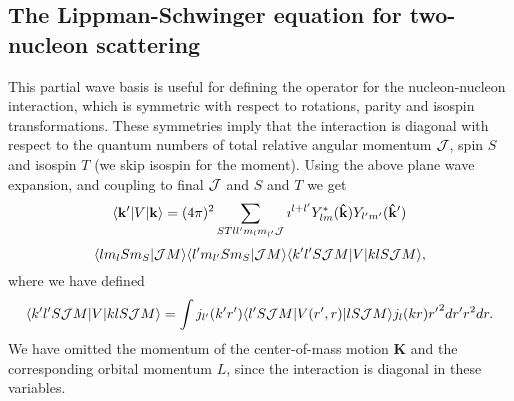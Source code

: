 \documentclass[%
twoside,                 %
final,                   %
10pt]{article}
\begin{document}
\subsection{The Lippman-Schwinger equation for two-nucleon scattering}
\begin{block}{}
This partial wave basis is useful for defining the operator for
the nucleon-nucleon interaction, which
is symmetric with respect to rotations, parity and
isospin transformations. These symmetries imply that the interaction is
diagonal with respect to the quantum numbers of total relative angular
momentum ${\cal J}$, spin $S$ and isospin $T$ (we skip isospin for the moment). Using the above plane wave expansion,
and coupling to final ${\cal J}$ and $S$ and $T$ we get
\[
 \langle\mathbf{k'}\vert V \vert\mathbf{k}\rangle= (4\pi)^2 \sum_{STll'm_lm_{l'}{\cal J}}\imath^{l+l'} Y_{lm}^{*}(\mathbf{\hat{k}}) Y_{l'm'}(\mathbf{\hat{k}'})
\]
\[
\langle lm_lSm_S|{\cal J}M\rangle \langle l'm_{l'}Sm_S|{\cal J}M\rangle\langle k'l'S{\cal J}M\vert V \vert klS{\cal J}M\rangle,
\]
where we have defined
\[
    \langle k'l'S{\cal J}M\vert V \vert klS{\cal J}M\rangle=\int j_{l'}(k'r')\langle l'S{\cal J}M\vert V(r',r)\vert lS{\cal J}M\rangle j_l(kr) {r'}^2 dr' r^2 dr.
\]
We have omitted the momentum of the center-of-mass motion $\mathbf{K}$ and the 
corresponding orbital momentum $L$, since the interaction is diagonal
in these variables.
\end{block}




\printindex
\end{document}
